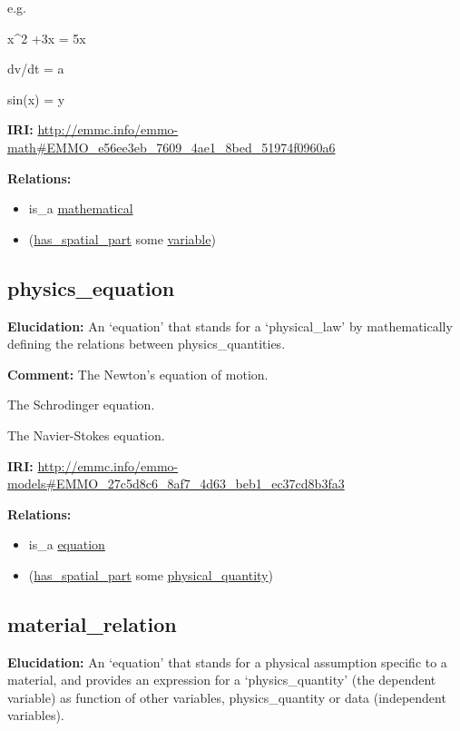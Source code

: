\documentclass[a4paper,]{report}
\providecommand{\tightlist}{%
  \setlength{\itemsep}{0pt}\setlength{\parskip}{0pt}}
\begin{document}
e.g.

x\^{}2 +3x = 5x

dv/dt = a

sin(x) = y

\textbf{IRI:}
\url{http://emmc.info/emmo-math\#EMMO_e56ee3eb_7609_4ae1_8bed_51974f0960a6}

\textbf{Relations:}

\begin{itemize}
\tightlist
\item
  is\_a \protect\hyperlink{mathematical}{mathematical}
\item
  (\protect\hyperlink{has_spatial_part}{has\_spatial\_part} some
  \protect\hyperlink{variable}{variable})
\end{itemize}

\hypertarget{physics_equation}{%
\subsection{physics\_equation}\label{physics_equation}}

\textbf{Elucidation:} An `equation' that stands for a `physical\_law' by
mathematically defining the relations between physics\_quantities.

\textbf{Comment:} The Newton's equation of motion.

The Schrodinger equation.

The Navier-Stokes equation.

\textbf{IRI:}
\url{http://emmc.info/emmo-models\#EMMO_27c5d8c6_8af7_4d63_beb1_ec37cd8b3fa3}

\textbf{Relations:}

\begin{itemize}
\tightlist
\item
  is\_a \protect\hyperlink{equation}{equation}
\item
  (\protect\hyperlink{has_spatial_part}{has\_spatial\_part} some
  \protect\hyperlink{physical_quantity}{physical\_quantity})
\end{itemize}

\hypertarget{material_relation}{%
\subsection{material\_relation}\label{material_relation}}

\textbf{Elucidation:} An `equation' that stands for a physical
assumption specific to a material, and provides an expression for a
`physics\_quantity' (the dependent variable) as function of other
variables, physics\_quantity or data (independent variables).
\end{document}
